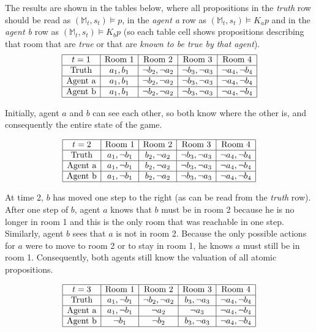 \documentclass[a4paper]{scrartcl}
\begin{document}
The results are shown in the tables below, where all propositions in the \emph{truth} row should be read as $(\mathbb{M}_t,s_t) \vDash p$, in the \emph{agent a} row as $(\mathbb{M}_t,s_t) \vDash K_ap$ and in the \emph{agent b} row as $(\mathbb{M}_t,s_t) \vDash K_bp$ (so each table cell shows propositions describing that room that are \emph{true} or that are \emph{known to be true by that agent}). 
$$\begin{array}{|c|c|c|c|c|}
\hline
t = 1 & \text{Room 1}&\text{Room 2}&\text{Room 3}&\text{Room 4}\\
\hline
\text{Truth} & a_1,b_1 & \neg b_2,\neg a_2 & \neg b_3,\neg a_3 & \neg a_4,\neg b_4\\
\hline
\text{Agent a} & a_1,b_1 & \neg b_2,\neg a_2 & \neg b_3,\neg a_3 & \neg a_4,\neg b_4\\
\hline
\text{Agent b} & a_1,b_1 & \neg b_2,\neg a_2 & \neg b_3,\neg a_3 & \neg a_4,\neg b_4\\
\hline
\end{array}$$

Initially, agent $a$ and $b$ can see each other, so both know where the other is, and consequently the entire state of the game. 


$$\begin{array}{|c|c|c|c|c|}
\hline
t=2 & \text{Room 1}&\text{Room 2}&\text{Room 3}&\text{Room 4}\\
\hline
\text{Truth} & a_1,\neg b_1 & b_2,\neg a_2 & \neg b_3,\neg a_3 & \neg a_4,\neg b_4\\
\hline
\text{Agent a} & a_1,\neg b_1 & b_2,\neg a_2 & \neg b_3,\neg a_3 & \neg a_4,\neg b_4\\
\hline
\text{Agent b} & a_1,\neg b_1 & b_2,\neg a_2 & \neg b_3,\neg a_3 & \neg a_4,\neg b_4\\
\hline
\end{array}$$

At time 2, $b$ has moved one step to the right (as can be read from the \emph{truth} row). After one step of $b$, agent $a$ knows that $b$ must be in room 2 because he is no longer in room 1 and this is the only room that was reachable in one step. Similarly, agent $b$ sees that $a$ is not in room 2. Because the only possible actions for $a$ were to move to room 2 or to stay in room 1, he knows $a$ must still be in room 1. Consequently, both agents still know the valuation of all atomic propositions. 


$$\begin{array}{|c|c|c|c|c|}
\hline
t = 3 & \text{Room 1}&\text{Room 2}&\text{Room 3}&\text{Room 4}\\
\hline
\text{Truth} & a_1,\neg b_1 & \neg b_2,\neg a_2 & b_3,\neg a_3 & \neg a_4,\neg b_4\\
\hline
\text{Agent a} & a_1,\neg b_1 & \neg a_2 & \neg a_3 & \neg a_4,\neg b_4\\
\hline
\text{Agent b} & \neg b_1 & \neg b_2 & b_3,\neg a_3 & \neg a_4,\neg b_4\\
\hline
\end{array}$$
\end{document}
